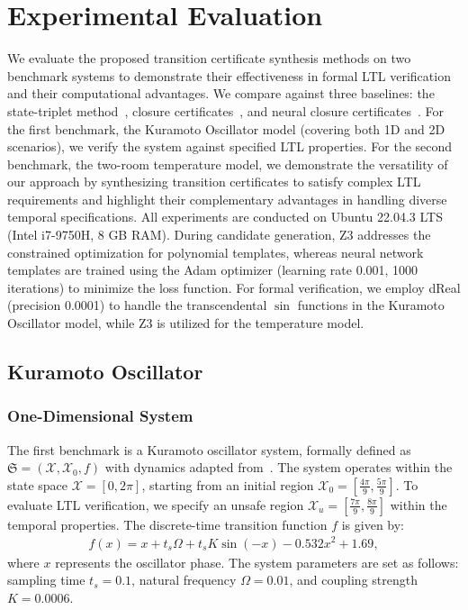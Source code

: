\section{Experimental Evaluation}
\label{sec:experiments}

We evaluate the proposed transition certificate synthesis methods on two benchmark systems to demonstrate their effectiveness in formal LTL verification and their computational advantages. We compare against three baselines: the state-triplet method~\cite{wongpiromsarn2015automata}, closure certificates~\cite{murali2024closure}, and neural closure certificates~\cite{nadali2024neural}. For the first benchmark, the Kuramoto Oscillator model (covering both 1D and 2D scenarios), we verify the system against specified LTL properties. For the second benchmark, the two-room temperature model, we demonstrate the versatility of our approach by synthesizing transition certificates to satisfy complex LTL requirements and highlight their complementary advantages in handling diverse temporal specifications. All experiments are conducted on Ubuntu 22.04.3 LTS (Intel i7-9750H, 8 GB RAM). During candidate generation, Z3 addresses the constrained optimization for polynomial templates, whereas neural network templates are trained using the Adam optimizer (learning rate 0.001, 1000 iterations) to minimize the loss function. For formal verification, we employ dReal (precision 0.0001) to handle the transcendental $\sin$ functions in the Kuramoto Oscillator model, while Z3 is utilized for the temperature model. 

\subsection{Kuramoto Oscillator}
\subsubsection{One-Dimensional System}
The first benchmark is a Kuramoto oscillator system, formally defined as $\mathfrak{S} = (\mathcal{X}, \mathcal{X}_0, f)$ with dynamics adapted from~\cite{anand2022small}. The system operates within the state space $\mathcal{X} = [0, 2\pi]$, starting from an initial region $\mathcal{X}_0 = [\frac{4\pi}{9}, \frac{5\pi}{9}]$. To evaluate LTL verification, we specify an unsafe region $\mathcal{X}_u = [\frac{7\pi}{9}, \frac{8\pi}{9}]$ within the temporal properties. The discrete-time transition function $f$ is given by:
\begin{align}
f(x) = x + t_s\Omega + t_s K \sin(-x) - 0.532 x^2 + 1.69,
\end{align}
where $x$ represents the oscillator phase. The system parameters are set as follows: sampling time $t_s = 0.1$, natural frequency $\Omega = 0.01$, and coupling strength $K = 0.0006$.



